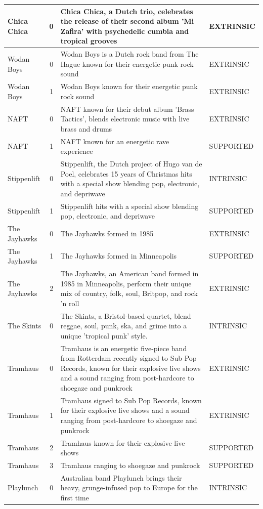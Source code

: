 \begin{center}
\begin{longtable}{p{3cm}cp{7cm}p{3cm}}
\midrule
Chica Chica & 0 & Chica Chica, a Dutch trio, celebrates the release of their second album 'Mi Zafira' with psychedelic cumbia and tropical grooves & EXTRINSIC \\
\midrule
Wodan Boys & 0 & Wodan Boys is a Dutch rock band from The Hague known for their energetic punk rock sound & EXTRINSIC \\
\midrule
Wodan Boys & 1 & Wodan Boys known for their energetic punk rock sound & EXTRINSIC \\
\midrule
NAFT & 0 & NAFT known for their debut album 'Brass Tactics', blends electronic music with live brass and drums & EXTRINSIC \\
\midrule
NAFT & 1 & NAFT known for an energetic rave experience & SUPPORTED \\
\midrule
Stippenlift & 0 & Stippenlift, the Dutch project of Hugo van de Poel, celebrates 15 years of Christmas hits with a special show blending pop, electronic, and depriwave & INTRINSIC \\
\midrule
Stippenlift & 1 & Stippenlift hits with a special show blending pop, electronic, and depriwave & SUPPORTED \\
\midrule
The Jayhawks & 0 & The Jayhawks formed in 1985 & EXTRINSIC \\
\midrule
The Jayhawks & 1 & The Jayhawks formed in Minneapolis & SUPPORTED \\
\midrule
The Jayhawks & 2 & The Jayhawks, an American band formed in 1985 in Minneapolis, perform their unique mix of country, folk, soul, Britpop, and rock 'n roll & EXTRINSIC \\
\midrule
The Skints & 0 & The Skints, a Bristol-based quartet, blend reggae, soul, punk, ska, and grime into a unique 'tropical punk' style. & INTRINSIC \\
\midrule
Tramhaus & 0 & Tramhaus is an energetic five-piece band from Rotterdam recently signed to Sub Pop Records, known for their explosive live shows and a sound ranging from post-hardcore to shoegaze and punkrock & EXTRINSIC \\
\midrule
Tramhaus & 1 & Tramhaus signed to Sub Pop Records, known for their explosive live shows and a sound ranging from post-hardcore to shoegaze and punkrock & EXTRINSIC \\
\midrule
Tramhaus & 2 & Tramhaus known for their explosive live shows & SUPPORTED \\
\midrule
Tramhaus & 3 & Tramhaus ranging to shoegaze and punkrock & SUPPORTED \\
\midrule
Playlunch & 0 & Australian band Playlunch brings their heavy, grunge-infused pop to Europe for the first time & INTRINSIC \\

\end{longtable}
\end{center}
